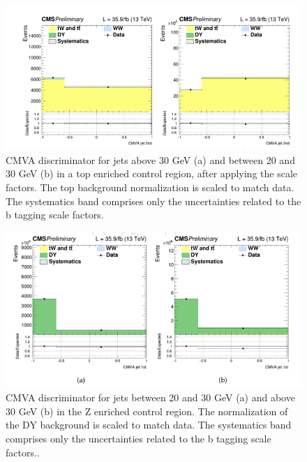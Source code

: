 \begin{figure}
\centering
\includegraphics[scale= 0.4]{../Cap4/cmvaT}
\caption{CMVA discriminator for jets above 30 GeV (a) and between 20 and 30 GeV (b) in a
top enriched control region, after applying the scale factors. The top background normalization
is scaled to match data. The systematics band comprises only the uncertainties related to the b
tagging scale factors.}
\label{cmvaT}
\end{figure}

\begin{figure}
\centering
\includegraphics[scale= 0.4]{../Cap4/cmvaD}
\caption{CMVA discriminator for jets between 20 and 30 GeV (a) and above 30 GeV (b) in the
Z enriched control region. The normalization of the DY background is scaled to match data.
The systematics band comprises only the uncertainties related to the b tagging scale factors..}
\label{cmvaD}
\end{figure}

